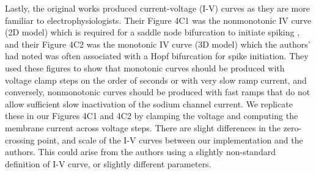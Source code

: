 Lastly, the original works produced current-voltage (I-V) curves as they are more familiar to electrophysiologists. Their Figure 4C1 was the nonmonotonic IV curve (2D model) which is required for a saddle node bifurcation to initiate spiking \cite{Qian2014}, and their Figure 4C2 was the monotonic IV curve (3D model) which the authors’ had noted was often associated with a Hopf bifurcation for spike initiation. They used these figures to show that monotonic curves should be produced with voltage clamp steps on the order of seconds or with very slow ramp current, and conversely, nonmonotonic curves should be produced with fast ramps that do not allow sufficient slow inactivation of the sodium channel current. We replicate these in our Figures 4C1 and 4C2 by clamping the voltage and computing the membrane current across voltage steps. There are slight differences in the zero-crossing point, and scale of the I-V curves between our implementation and the authors. This could arise from the authors using a slightly non-standard definition of I-V curve, or slightly different parameters. 

